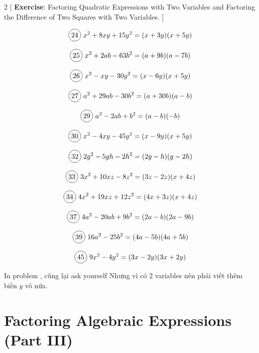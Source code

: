\begin{multicols}{2}
[
  \textbf{Exercise}: Factoring Quadratic Expressions with Two Variables and Factoring the Difference of Two Squares with Two Variables.
]

\begin{align*}
  \circled{24}\ x^{2}+8xy+15y^{2}=(x+3y)(x+5y)
\end{align*}

  \[\circled{25}\ x^{2}+2ab-63b^{2}=(a+9b)(a-7b)\]

  \[\circled{26}\ x^{2}-xy-30y^{2}=(x-6y)(x+5y)\]

  \[\circled{27}\ a^{2}+29ab-30b^{2}=(a+30b)(a-b)\]

  \[\circled{29}\ a^{2}-2ab+b^{2}=(a-b)(-b)\]

  \[\circled{30}\ x^{2}-4xy-45y^{2}=(x-9y)(x+5y)\]

  \[\circled{32}\ 2g^{2}-5gh-2h^{2}=(2g-h)(g-2h)\]

  \[\circled{33}\ 3x^{2}+10xz-8z^{2}=(3z-2z)(x+4z)\]

  \[\circled{34}\ 4x^{2}+19xz+12z^{2}=(4x+3z)(x+4z)\]

  \[\circled{37}\ 4a^{2}-20ab+9b^{2}=(2a-b)(2a-9b)\]

  \[\circled{39}\ 16a^{2}-25b^{2}=(4a-5b)(4a+5b)\]

  \[\circled{45}\ 9x^{2}-4y^{2}=(3x-2y)(3x+2y)\]
\end{multicols}

In problem , cũng lại ask yourself  Nhưng vì có 2 variables nên phải viết thêm biến $y$ vô nữa.

\section{Factoring Algebraic Expressions (Part III)}

